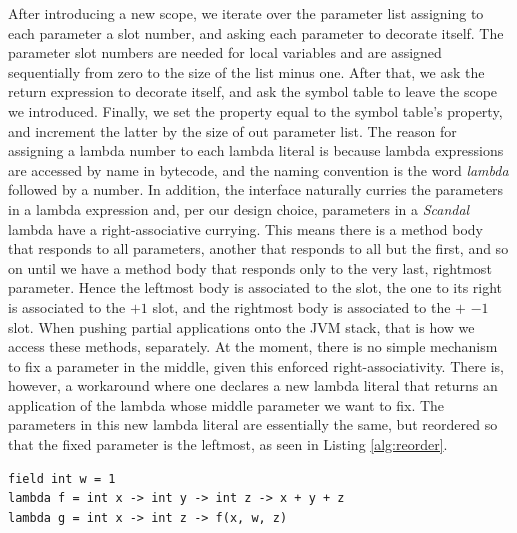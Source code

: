 After introducing a new scope, we iterate over the parameter list assigning to each parameter a slot number, and asking each parameter to decorate itself. The parameter slot numbers are needed for local variables and are assigned sequentially from zero to the size of the list minus one. After that, we ask the return expression to decorate itself, and ask the symbol table to leave the scope we introduced. Finally, we set the  property equal to the symbol table's  property, and increment the latter by the size of out parameter list. The reason for assigning a lambda number to each lambda literal is because lambda expressions are accessed by name in bytecode, and the naming convention is the word \emph{lambda} followed by a number. In addition, the  interface naturally curries the parameters in a lambda expression and, per our design choice, parameters in a \emph{Scandal} lambda have a right-associative currying. This means there is a method body that responds to all parameters, another that responds to all but the first, and so on until we have a method body that responds only to the very last, rightmost parameter. Hence the leftmost body is associated to the  slot, the one to its right is associated to the $+ 1$ slot, and the rightmost body is associated to the  $+$ $- 1$ slot. When pushing partial applications onto the JVM stack, that is how we access these methods, separately. At the moment, there is no simple mechanism to fix a parameter in the middle, given this enforced right-associativity. There is, however, a workaround where one declares a new lambda literal that returns an application of the lambda whose middle parameter we want to fix. The parameters in this new lambda literal are essentially the same, but reordered so that the fixed parameter is the leftmost, as seen in Listing \ref{alg:reorder}.

\begin{lstlisting}[emph={field,int,lambda,print},emphstyle={\textbf},caption={Right associativity of lambda expressions.},label={alg:reorder}]
field int w = 1
lambda f = int x -> int y -> int z -> x + y + z
lambda g = int x -> int z -> f(x, w, z)
\end{lstlisting}

